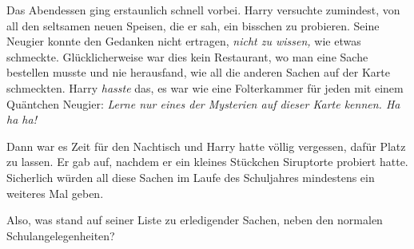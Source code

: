 Das Abendessen ging erstaunlich schnell vorbei. Harry versuchte zumindest, von all den seltsamen neuen Speisen, die er sah, ein bisschen zu probieren. Seine Neugier konnte den Gedanken nicht ertragen, \emph{nicht zu wissen,} wie etwas schmeckte. Glücklicherweise war dies kein Restaurant, wo man eine Sache bestellen musste und nie herausfand, wie all die anderen Sachen auf der Karte schmeckten. Harry \emph{hasste} das, es war wie eine Folterkammer für jeden mit einem Quäntchen Neugier: \emph{Lerne nur eines der Mysterien auf dieser Karte kennen. Ha ha ha!}

Dann war es Zeit für den Nachtisch und Harry hatte völlig vergessen, dafür Platz zu lassen. Er gab auf, nachdem er ein kleines Stückchen Siruptorte probiert hatte.%
Sicherlich würden all diese Sachen im Laufe des Schuljahres mindestens ein weiteres Mal geben.

Also, was stand auf seiner Liste zu erledigender Sachen, neben den normalen Schulangelegenheiten?


